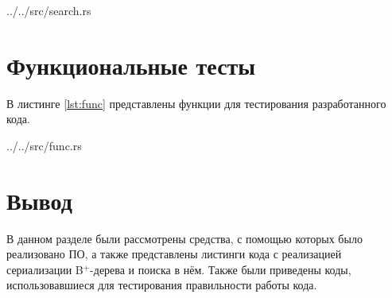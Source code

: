 \begin{lstinputlisting}[
        caption={Реализация алгоритма поиска данных},
        label={lst:search},
        style={rust},
    ]{../../src/search.rs}
\end{lstinputlisting}

\section{Функциональные тесты}

В листинге \ref{lst:func} представлены функции для тестирования разработанного кода.

\begin{lstinputlisting}[
        caption={Функциональные тесты},
        label={lst:func},
        style={rust},
    ]{../../src/func.rs}
\end{lstinputlisting}

\section*{Вывод}

В данном разделе были рассмотрены средства, с помощью которых было реализовано ПО, а также представлены листинги кода с реализацией сериализации B$^+$-дерева и поиска в нём. Также были приведены коды, использовавшиеся для тестирования правильности работы кода.
